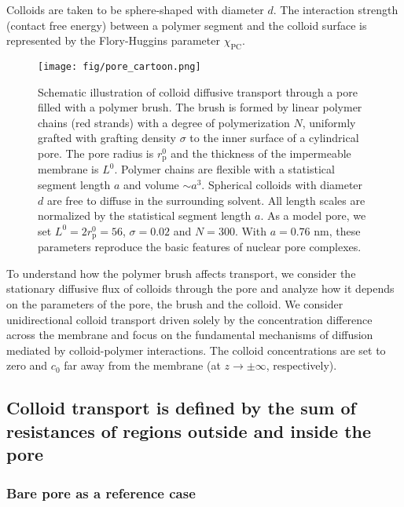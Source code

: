 \documentclass[12pt, a4paper]{article}
\begin{document}
Colloids are taken to be sphere-shaped with diameter $d$.
The interaction strength (contact free energy) between a polymer segment and the colloid surface is represented by the Flory-Huggins parameter $\chi_{\text{PC}}$.

\begin{figure}
    \centering
    \texttt{[image: fig/pore\_cartoon.png]}
    \caption{
        Schematic illustration of colloid diffusive transport through a pore filled with a polymer brush. 
        The brush is formed by linear polymer chains (red strands) with a degree of polymerization $N$, uniformly grafted with grafting density $\sigma$ 
        to the inner surface of a cylindrical pore.
        The pore radius is $r_{\text{p}}^0$ and the thickness of the impermeable membrane is $L^0$.
        Polymer chains are flexible with a statistical segment length $a$ and volume $\sim a^3$. 
        Spherical colloids with diameter $d$ are free to diffuse in the surrounding solvent.
        All length scales are normalized by the statistical segment length $a$.
        As a model pore, we set $L^0 = 2r_{\text{p}}^0 = 56$, $\sigma = 0.02$ and $N = 300$.
        With $a = 0.76 {\text{ nm}}$, these parameters reproduce the basic features of nuclear pore complexes.
        }
    \label{fig:colloid_transport}
\end{figure}

To understand how the polymer brush affects transport, we consider the stationary diffusive flux of colloids through the pore and analyze how it depends on the parameters of the pore, the brush and the colloid.
We consider unidirectional colloid transport driven solely by the concentration difference across the membrane and focus on the fundamental mechanisms of diffusion mediated by colloid-polymer interactions.
The colloid concentrations are set to zero and $c_0$ far away from the membrane (at $z\rightarrow\pm\infty$, respectively).


\subsection{Colloid transport is defined by the sum of resistances of regions outside and inside the pore}

\subsubsection{Bare pore as a reference case}
\end{document}
